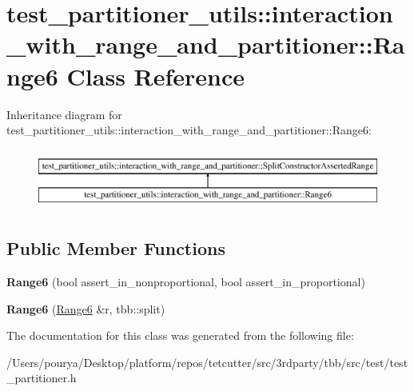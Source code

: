 \hypertarget{classtest__partitioner__utils_1_1interaction__with__range__and__partitioner_1_1Range6}{}\section{test\+\_\+partitioner\+\_\+utils\+:\+:interaction\+\_\+with\+\_\+range\+\_\+and\+\_\+partitioner\+:\+:Range6 Class Reference}
\label{classtest__partitioner__utils_1_1interaction__with__range__and__partitioner_1_1Range6}
Inheritance diagram for test\+\_\+partitioner\+\_\+utils\+:\+:interaction\+\_\+with\+\_\+range\+\_\+and\+\_\+partitioner\+:\+:Range6\+:\begin{figure}[H]
\begin{center}
\leavevmode
\includegraphics[height=2.000000cm]{classtest__partitioner__utils_1_1interaction__with__range__and__partitioner_1_1Range6}
\end{center}
\end{figure}
\subsection*{Public Member Functions}
\begin{DoxyCompactItemize}
\item 
\hypertarget{classtest__partitioner__utils_1_1interaction__with__range__and__partitioner_1_1Range6_a6f6909653a490cc81221ff6d36e25443}{}{\bfseries Range6} (bool assert\+\_\+in\+\_\+nonproportional, bool assert\+\_\+in\+\_\+proportional)\label{classtest__partitioner__utils_1_1interaction__with__range__and__partitioner_1_1Range6_a6f6909653a490cc81221ff6d36e25443}

\item 
\hypertarget{classtest__partitioner__utils_1_1interaction__with__range__and__partitioner_1_1Range6_a9ef48aa7697cc77c40ef8b0a9a890d25}{}{\bfseries Range6} (\hyperlink{classtest__partitioner__utils_1_1interaction__with__range__and__partitioner_1_1Range6}{Range6} \&r, tbb\+::split)\label{classtest__partitioner__utils_1_1interaction__with__range__and__partitioner_1_1Range6_a9ef48aa7697cc77c40ef8b0a9a890d25}

\end{DoxyCompactItemize}


The documentation for this class was generated from the following file\+:\begin{DoxyCompactItemize}
\item 
/\+Users/pourya/\+Desktop/platform/repos/tetcutter/src/3rdparty/tbb/src/test/test\+\_\+partitioner.\+h\end{DoxyCompactItemize}
